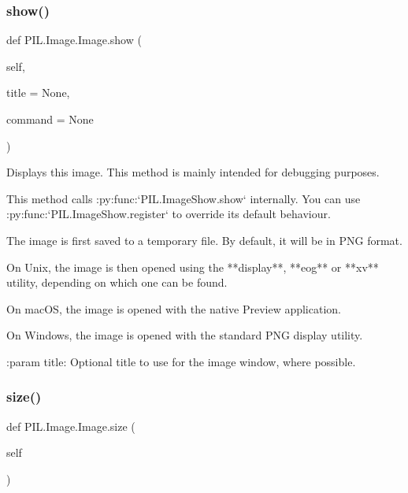 \subsubsection{\texorpdfstring{show()}{show()}}
{\footnotesize\ttfamily def P\+I\+L.\+Image.\+Image.\+show (\begin{DoxyParamCaption}\item[{}]{self,  }\item[{}]{title = {\ttfamily None},  }\item[{}]{command = {\ttfamily None} }\end{DoxyParamCaption})}

\begin{DoxyVerb}Displays this image. This method is mainly intended for debugging purposes.

This method calls :py:func:`PIL.ImageShow.show` internally. You can use
:py:func:`PIL.ImageShow.register` to override its default behaviour.

The image is first saved to a temporary file. By default, it will be in
PNG format.

On Unix, the image is then opened using the **display**, **eog** or
**xv** utility, depending on which one can be found.

On macOS, the image is opened with the native Preview application.

On Windows, the image is opened with the standard PNG display utility.

:param title: Optional title to use for the image window, where possible.
\end{DoxyVerb}
 \mbox{\label{classPIL_1_1Image_1_1Image_a0f36830cb12ce70f2193bc401e7e1ef7}} 
\subsubsection{\texorpdfstring{size()}{size()}}
{\footnotesize\ttfamily def P\+I\+L.\+Image.\+Image.\+size (\begin{DoxyParamCaption}\item[{}]{self }\end{DoxyParamCaption})}

\mbox{\label{classPIL_1_1Image_1_1Image_a00b23083c84ef92778fd0b189141d579}} 
